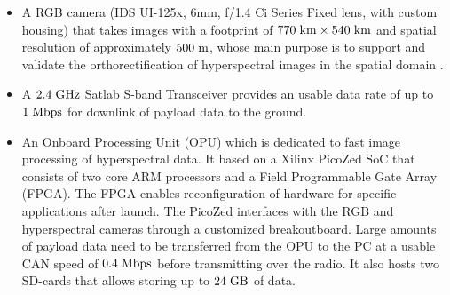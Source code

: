 \begin{itemize}
    \item A RGB camera (IDS UI-125x, 6mm, f/1.4 Ci Series Fixed lens, with custom housing) that takes images with a footprint of $770 \hspace{3pt} \rm{km} \times 540 \hspace{3pt} \rm{km}$ and spatial resolution of approximately $500 \hspace{3pt} \rm{m}$, whose main purpose is to support and validate the orthorectification of hyperspectral images in the spatial domain \cite{habib2016ortho}.
    \item A $2.4 \hspace{3pt}  \rm{GHz}$ Satlab S-band Transceiver provides an usable data rate of up to $1 \hspace{3pt} \rm{Mbps}$ for downlink of payload data to the ground. 
    \item An Onboard Processing Unit (OPU) which is dedicated to fast image processing of hyperspectral data. It based on a Xilinx PicoZed SoC that consists of two core ARM processors and a Field Programmable Gate Array (FPGA). The FPGA enables reconfiguration of hardware for specific applications after launch. The PicoZed interfaces with the RGB and hyperspectral cameras through a customized breakoutboard. Large amounts of payload data need to be transferred from the OPU to the PC at a usable CAN speed of $0.4 \hspace{3pt} \rm{Mbps}$ before transmitting over the radio. It also hosts two SD-cards that allows storing up to $24 \hspace{3pt} \rm{GB}$ of data. 
\end{itemize}

